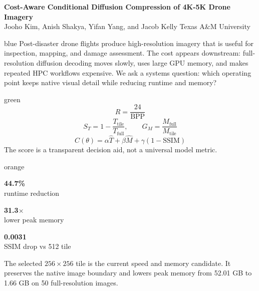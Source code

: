\documentclass{article}
\newcommand{\metric}[3]{%
\begin{tcolorbox}[enhanced,colback=#1!8,colframe=#1,boxrule=2.5pt,arc=8pt,width=0.31\linewidth,halign=center,valign=center]
{\fontsize{42}{46}\selectfont\bfseries #2}\\[6pt]
{\fontsize{20}{24}\selectfont #3}
\end{tcolorbox}}
\begin{document}
\color{ink}

\begin{tcolorbox}[enhanced, colback=ink, colframe=ink, arc=0pt, boxrule=0pt, left=30pt, right=30pt, top=28pt, bottom=28pt]
{\color{white}\fontsize{76}{82}\selectfont\bfseries Cost-Aware Conditional Diffusion Compression of 4K-5K Drone Imagery}\\[14pt]
{\color{white}\fontsize{34}{40}\selectfont Jooho Kim, Anish Shakya, Yifan Yang, and Jacob Kelly \hfill Texas A\&M University}
\end{tcolorbox}

\vspace{0.45in}

\begin{minipage}[t]{0.31\linewidth}
\vspace{0pt}
\begin{posterbox}[Problem]{blue}
{\fontsize{25}{31}\selectfont
Post-disaster drone flights produce high-resolution imagery that is useful for inspection, mapping, and damage assessment. The cost appears downstream: full-resolution diffusion decoding moves slowly, uses large GPU memory, and makes repeated HPC workflows expensive. We ask a systems question: which operating point keeps native visual detail while reducing runtime and memory?}
\end{posterbox}

\vspace{0.35in}
\begin{posterbox}{green}
{\fontsize{28}{36}\selectfont
\[
R=\frac{24}{\mathrm{BPP}}
\]
\[
S_T=1-\frac{T_{\mathrm{tile}}}{T_{\mathrm{full}}},\qquad
G_M=\frac{M_{\mathrm{full}}}{M_{\mathrm{tile}}}
\]
\[
C(\theta)=\alpha \hat{T}+\beta \hat{M}+\gamma(1-\mathrm{SSIM})
\]
The score is a transparent decision aid, not a universal model metric.}
\end{posterbox}

\vspace{0.35in}
\begin{posterbox}{orange}
\noindent
\metric{green}{44.7\%}{runtime reduction}\hfill
\metric{blue}{31.3$\times$}{lower peak memory}\hfill
\metric{orange}{0.0031}{SSIM drop vs 512 tile}
{\fontsize{25}{31}\selectfont
The selected $256 \times 256$ tile is the current speed and memory candidate. It preserves the native image boundary and lowers peak memory from 52.01 GB to 1.66 GB on 50 full-resolution images.}
\end{posterbox}
\end{minipage}
\hfill
\end{document}
